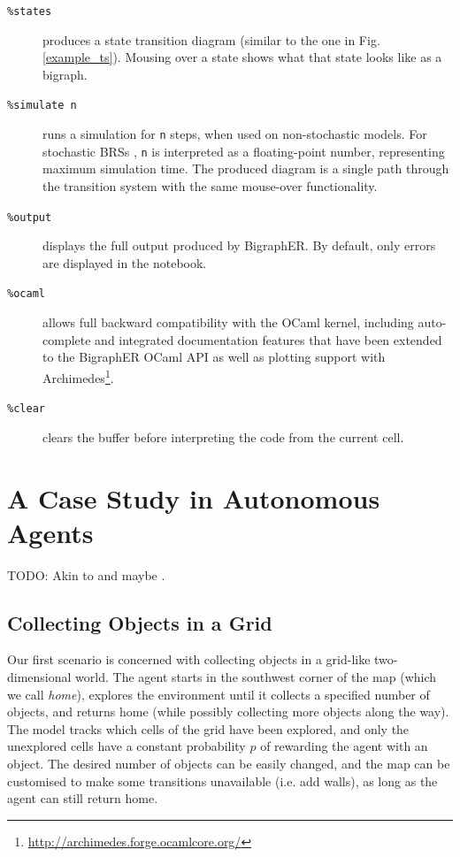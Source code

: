 \documentclass[runningheads]{llncs}
\begin{document}
\begin{description}
  \item[\texttt{\%states}] produces a state transition diagram (similar to the
    one in Fig. \ref{example_ts}). Mousing over a state shows what that
    state looks like as a bigraph.
  \item[\texttt{\%simulate n}] runs a simulation for \texttt{n} steps, when used
    on non-stochastic models. For stochastic BRSs
    \cite{DBLP:journals/entcs/KrivineMT08}, \texttt{n} is interpreted as a
    floating-point number, representing maximum simulation time. The produced
    diagram is a single path through the transition system with the same
    mouse-over functionality.
  \item[\texttt{\%output}] displays the full output produced by BigraphER. By
    default, only errors are displayed in the notebook.
  \item[\texttt{\%ocaml}] allows full backward compatibility with the OCaml
    kernel, including auto-complete and integrated documentation features that
    have been extended to the BigraphER OCaml API as well as plotting support
    with Archimedes\footnote{\url{http://archimedes.forge.ocamlcore.org/}}.
  \item[\texttt{\%clear}] clears the buffer before interpreting the code from
    the current cell.
\end{description}

\section{A Case Study in Autonomous Agents}

TODO: Akin to \cite{dblp:conf/nfm/giaquintahimn18} and maybe
\cite{koenig1998xavier}.

\subsection{Collecting Objects in a Grid}

Our first scenario is concerned with collecting objects in a grid-like
two-dimensional world. The agent starts in the southwest corner of the map
(which we call \emph{home}), explores the environment until it collects a
specified number of objects, and returns home (while possibly collecting more
objects along the way). The model tracks which cells of the grid have been
explored, and only the unexplored cells have a constant probability $p$ of
rewarding the agent with an object. The desired number of objects can be easily
changed, and the map can be customised to make some transitions unavailable
(i.e. add walls), as long as the agent can still return home.
\end{document}
